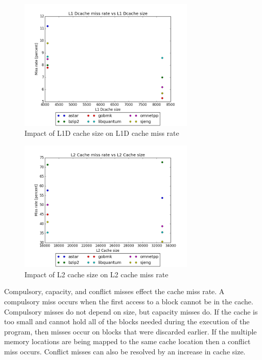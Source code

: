 \documentclass{article}
\begin{document}
\begin{figure}[ht]
    \centering
    \includegraphics[width=0.75\textwidth]{plots/L1_Dcache_miss_vs_L1_Dcache_size.png}
    \caption{Impact of L1D cache size on L1D cache miss rate}
    \label{fig:l1vsmiss}
\end{figure}

\begin{figure}[ht]
    \centering
    \includegraphics[width=0.75\textwidth]{plots/L2cache_miss_vs_size.png}
    \caption{Impact of L2 cache size on L2 cache miss rate}
    \label{fig:l2vsmiss}
\end{figure}


Compulsory, capacity, and conflict misses effect the cache miss rate. A compulsory miss occurs when the first access to a block cannot be in the cache. Compulsory misses do not depend on size, but capacity misses do. If the cache is too small and cannot hold all of the blocks needed during the execution of the program, then misses occur on blocks that were discarded earlier. If the multiple memory locations are being mapped to the same cache location then a conflict miss occurs. Conflict misses can also be resolved by an increase in cache size.
\end{document}
